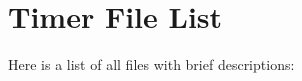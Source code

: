 \section{Timer File List}
Here is a list of all files with brief descriptions:\begin{CompactList}
\item{}
\item{}
\end{CompactList}
